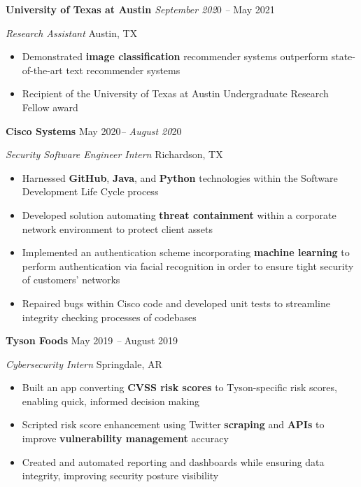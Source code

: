 \documentclass[
]{article}
\providecommand{\tightlist}{%
  \setlength{\itemsep}{0pt}\setlength{\parskip}{0pt}}
\begin{document}
\hfill\break

\textbf{University of Texas at Austin}{\emph{{ }September 202}}0{
\textbf{\emph{}} \emph{--} }May 2021

\emph{Research Assistant}{\emph{{ }}}Austin, TX

\begin{itemize}
\tightlist
\item
  Demonstrated \textbf{image classification} recommender systems
  outperform state-of-the-art text recommender systems{~}
\item
  Recipient of the University of Texas at Austin Undergraduate Research
  Fellow award{~}
\end{itemize}

\hfill\break

\textbf{Cisco Systems}{\emph{{ }}}May 2020{\emph{-- August 20}}20

\emph{Security Software Engineer Intern}{\emph{{ }}}Richardson, TX

\begin{itemize}
\tightlist
\item
  Harnessed \textbf{GitHub}, \textbf{Java}, and \textbf{Python}
  technologies within the Software Development Life Cycle process{~}
\item
  Developed solution automating \textbf{threat containment} within a
  corporate network environment to protect client assets{~}
\item
  Implemented an authentication scheme incorporating \textbf{machine
  learning} to perform authentication via facial recognition in order to
  ensure tight security of customers' networks{~}
\item
  Repaired bugs within Cisco code and developed unit tests to streamline
  integrity checking processes of codebases{~}
\end{itemize}

\hfill\break

\textbf{Tyson Foods}{\emph{{ }}}May 2019 {\emph{--} }August 2019

\emph{Cybersecurity Intern}{\emph{{ }}}Springdale, AR

\begin{itemize}
\tightlist
\item
  Built an app converting \textbf{CVSS risk scores} to Tyson-specific
  risk scores, enabling quick, informed decision making
\item
  Scripted risk score enhancement using Twitter \textbf{scraping} and
  \textbf{APIs} to improve \textbf{vulnerability management}
  accuracy\textbf{{~}}
\item
  Created and automated reporting and dashboards while ensuring data
  integrity, improving security posture visibility {~ ~}
\end{itemize}
\end{document}
